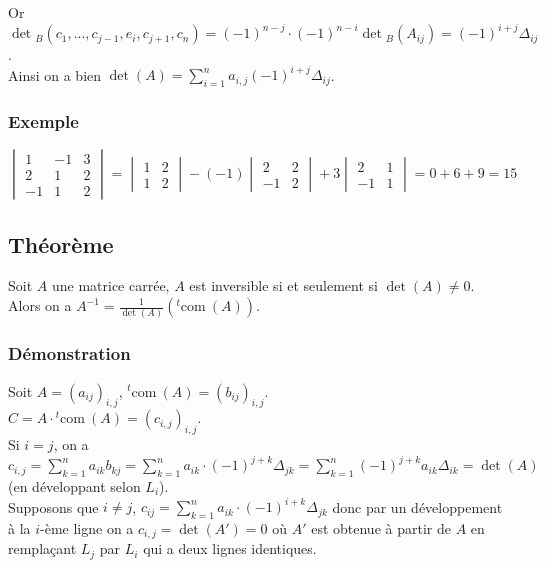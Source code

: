 \documentclass[a4paper,10pt]{book} %
\newcommand{\displayAmath}{\displaystyle}
\newcommand{\com}{\mathrm{com}~} %
\begin{document}
Or $\displayAmath\det{}_B(c_1,...,c_{j-1},e_i,c_{j+1},c_n)=(-1)^{n-j}\cdot (-1)^{n-i} \det{}_B(A_{ij})=(-1)^{i+j}\Delta_{ij}$.\\

Ainsi on a bien $\det(A)=\sum_{i=1}^na_{i,j}(-1)^{i+j}\Delta_{ij}$.

\subsubsection{Exemple}
$\begin{vmatrix}
1 & -1 &3 \\2&1&2\\-1&1&2
\end{vmatrix}=\begin{vmatrix}
1&2\\1&2
\end{vmatrix}-(-1)\begin{vmatrix}
2&2\\-1&2
\end{vmatrix}+3\begin{vmatrix}
2&1\\-1&1
\end{vmatrix}=0+6+9=15$

\subsection{Théorème}
Soit $A$ une matrice carrée, $A$ est inversible si et seulement si $\det(A)\neq 0$.\\
Alors on a $\displayAmath A^{-1}=\frac{1}{\det(A)}({}^t\com(A))$.

\subsubsection{Démonstration}
Soit $A=(a_{ij})_{i,j}$, ${}^t\com(A)=(b_{ij})_{i,j}$.\\

$C=A\cdot {}^t\com(A)=(c_{i,j})_{i,j}$.\\

Si $i=j$, on a $\displayAmath c_{i,j}=\sum_{k=1}^na_{ik}b_{kj}=\sum_{k=1}^na_{ik}\cdot (-1)^{j+k}\Delta_{jk}=\sum_{k=1}^n(-1)^{j+k}a_{ik}\Delta_{ik}=\det(A)$ (en développant selon $L_i$).\\

Supposons que $i\neq j$, $\displayAmath c_{ij}=\sum_{k=1}^na_{ik}\cdot (-1)^{i+k}\Delta_{jk}$
donc par un développement à la $i$-ème ligne on a $c_{i,j}=\det(A')=0$ où $A'$ est obtenue à partir de $A$ en remplaçant $L_j$ par $L_i$ qui a deux lignes identiques.
\end{document}
